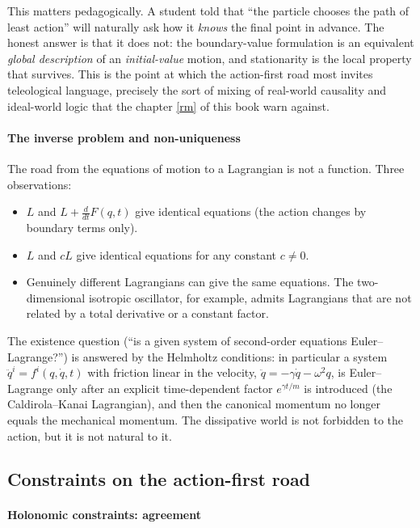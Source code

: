 This matters pedagogically. A student told that ``the particle chooses the
path of least action'' will naturally ask how it \emph{knows} the final point
in advance. The honest answer is that it does not: the boundary-value
formulation is an equivalent \emph{global description} of an \emph{initial-value}
motion, and stationarity is the local property that survives. This is the
point at which the action-first road most invites teleological language,
precisely the sort of mixing of real-world causality and ideal-world logic
that the  chapter \ref{rm} of this book warn against.

\paragraph{The inverse problem and non-uniqueness}
\label{inverse}

The road from the equations of motion to a Lagrangian is not a function. Three
observations:
\begin{itemize}
  \item $L$ and $L+\frac{d}{dt}F(q,t)$ give identical equations (the action
  changes by boundary terms only).
  \item $L$ and $cL$ give identical equations for any constant $c\neq0$.
  \item Genuinely different Lagrangians can give the same equations. The
  two-dimensional isotropic oscillator, for example, admits Lagrangians that
  are not related by a total derivative or a constant factor.
\end{itemize}
The existence question (``is a given system of second-order equations
Euler--Lagrange?'') is answered by the Helmholtz conditions: in particular a
system $\ddot q^i=f^i(q,\dot q,t)$ with friction linear in the velocity,
$\ddot q=-\gamma\dot q-\omega^2q$, is Euler--Lagrange only after an explicit
time-dependent factor $e^{\gamma t/m}$ is introduced (the Caldirola--Kanai
Lagrangian), and then the canonical momentum no longer equals the mechanical
momentum. The dissipative world is not forbidden to the action, but it is not
natural to it.

\subsection{Constraints on the action-first road}
\label{constraints-variational}

\paragraph{Holonomic constraints: agreement}

